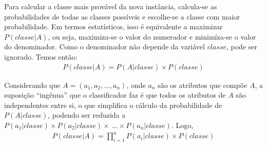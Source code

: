 Para calcular a classe mais provável da nova instância, calcula-se as probabilidades de todas as classes possíveis e escolhe-se a classe com maior probabilidade. Em termos estatísticos, isso é equivalente a maximizar \(P(classe|A)\), ou seja, maximiza-se o valor do numerador e minimíza-se o valor do denominador. Como o denominador não depende da variável \(classe\), pode ser ignorado. Temos então:
%
\begin{align}
P(classe|A) = P(A|classe) \times P(classe)
\end{align}

Considerando que \(A= ( a_1, a_2, \ldots , a_n)\), onde \(a_n\) são os atributos que compõe \(A\), a suposição ``ingênua'' que o classificador faz é que todos os atributos de \(A\) são independentes entre si, o que simplifica o cálculo da probabilidade de \(P(A|classe)\), podendo ser reduzida a \(P(a_1|classe) \times P(a_2|classe) \times\ \ldots \times P(a_n|classe)\). Logo,
%
\begin{align}
P(classe|A) = \prod_{i=1}^{n} P(a_i|classe) \times P(classe)
\end{align}
